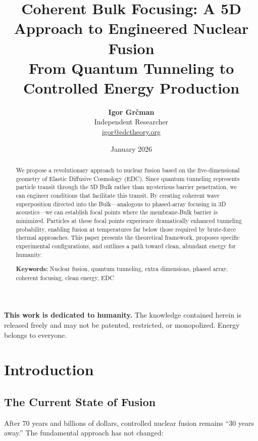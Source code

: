 \documentclass[12pt,a4paper]{article}
\title{
    \vspace{-1cm}
    {\LARGE\textbf{Coherent Bulk Focusing: A 5D Approach to Engineered Nuclear Fusion}}\\[0.5cm]
    {\large From Quantum Tunneling to Controlled Energy Production}
}
\author{
    \textbf{Igor Grčman}\\[0.2cm]
    \small Independent Researcher\\
    \small \href{mailto:igor@edctheory.org}{igor@edctheory.org}
}
\date{January 2026}
\begin{document}
\maketitle

\begin{dedication}
\textbf{This work is dedicated to humanity.} The knowledge contained herein is released freely and may not be patented, restricted, or monopolized. Energy belongs to everyone.
\end{dedication}

\begin{abstract}
We propose a revolutionary approach to nuclear fusion based on the five-dimensional geometry of Elastic Diffusive Cosmology (EDC). Since quantum tunneling represents particle transit through the 5D Bulk rather than mysterious barrier penetration, we can engineer conditions that facilitate this transit. By creating coherent wave superposition directed into the Bulk---analogous to phased-array focusing in 3D acoustics---we can establish focal points where the membrane-Bulk barrier is minimized. Particles at these focal points experience dramatically enhanced tunneling probability, enabling fusion at temperatures far below those required by brute-force thermal approaches. This paper presents the theoretical framework, proposes specific experimental configurations, and outlines a path toward clean, abundant energy for humanity.

\vspace{0.3cm}
\noindent\textbf{Keywords:} Nuclear fusion, quantum tunneling, extra dimensions, phased array, coherent focusing, clean energy, EDC
\end{abstract}

\tableofcontents
\newpage

\section{Introduction}

\subsection{The Current State of Fusion}

After 70 years and billions of dollars, controlled nuclear fusion remains ``30 years away.'' The fundamental approach has not changed:
\end{document}
